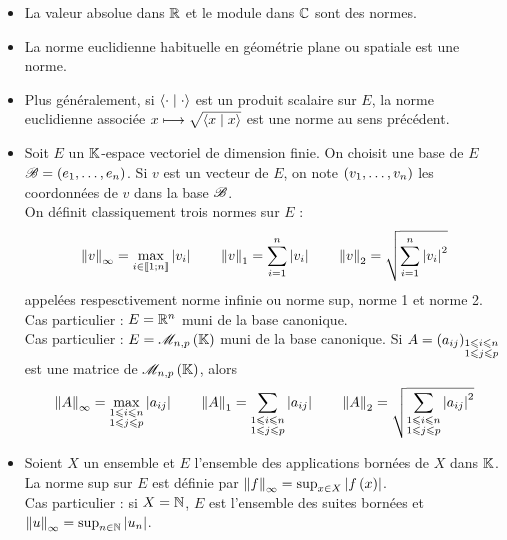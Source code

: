 \begin{itemize}
    \item La valeur absolue dans \(\mathbb{R}\) et le module dans \(\mathbb{C}\) sont des normes. \\
    \item La norme euclidienne habituelle en géométrie plane ou spatiale est une norme. \\
    \item Plus généralement, si \(\ps{\cdot}{\cdot}\) est un produit scalaire sur \(E\), la norme euclidienne associée \(x\mapsto\sqrt{\ps{x}{x}}\) est une norme au sens précédent. \\
    \item Soit \(E\) un \(\mathbb{K}\)-espace vectoriel de dimension finie. On choisit une base de \(E\) \(\mathscr{B}=\left(e_1,\dots,e_n\right)\). Si \(v\) est un vecteur de \(E\), on note \(\left(v_1,\dots,v_n\right)\) les coordonnées de \(v\) dans la base \(\mathscr{B}\). \\ On définit classiquement trois normes sur \(E\) : \[\norme{v}_\infty=\max_{i\in\interventierii{1}{n}}\abs{v_i}\qquad\norme{v}_1=\sum_{i=1}^n\abs{v_i}\qquad\norme{v}_2=\sqrt{\sum_{i=1}^n\abs{v_i}^2}\] appelées respesctivement norme infinie ou norme sup, norme 1 et norme 2. \\ Cas particulier : \(E=\mathbb{R}^n\) muni de la base canonique. \\ Cas particulier : \(E=\M{n,p}\) muni de la base canonique. Si \(A=\left(a_{ij}\right)_{\substack{1\leqslant i\leqslant n \\ 1\leqslant j\leqslant p}}\) est une matrice de \(\M{n,p}\), alors \[\norme{A}_\infty=\max_{\substack{1\leq i\leq n \\ 1\leq j\leq p}}\abs{a_{ij}}\qquad\norme{A}_1=\sum_{\substack{1\leq i\leq n \\ 1\leq j\leq p}}\abs{a_{ij}}\qquad\norme{A}_2=\sqrt{\sum_{\substack{1\leq i\leq n \\ 1\leq j\leq p}}\abs{a_{ij}}^2}\]
    \item Soient \(X\) un ensemble et \(E\) l'ensemble des applications bornées de \(X\) dans \(\mathbb{K}\). La norme sup sur \(E\) est définie par \(\norme{f}_\infty=\sup_{x\in X}\abs{f\paren{x}}\). \\ Cas particulier : si \(X=\mathbb{N}\), \(E\) est l'ensemble des suites bornées et \(\norme{u}_\infty=\sup_{n\in\N}\abs{u_n}\).
\end{itemize}

